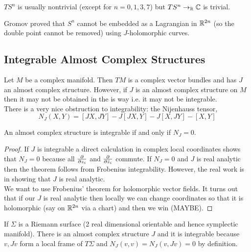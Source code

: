 \documentclass[12pt]{article}
\begin{document}
\begin{rmk}
$T S^n$ is usually nontrivial (except for $n = 0,1,3,7$) but $T S^n \to_{\mathbb{R}} \mathbb{C}$ is trivial.
\end{rmk}

\begin{rmk}
Gromov proved that $S^n$ cannot be embedded as a Lagrangian in $\mathbb{R}^{2n}$ (so the double point cannot be removed) using $J$-holomorphic curves.
\end{rmk}

\subsection{Integrable Almost Complex Structures}

Let $M$ be a complex manifold. Then $T M$ is a complex vector bundles and has $J$ an almost complex structure. However, if $J$ is an almost complex structure on $M$ then it may not be obtained in the is way i.e. it may not be integrable. 
\bigskip\\
There is a very nice obstruction to integrability: the Nijenhauss tensor,
\[ N_J(X,Y) = [JX, JY] - J[JX, Y] - J[X,JY] - [X,Y] \]

\begin{theorem}
An almost complex structure is integrable if and only if $N_J = 0$.
\end{theorem}

\begin{proof}
If $J$ is integrable a direct calculation in complex local coordinates shows that $N_J = 0$ because all $\frac{\partial{}}{\partial{z_i}}$ and $\frac{\partial{}}{\partial{\bar{z}_i}}$ commute. If $N_J = 0$ and $J$ is real analytic then the theorem follows from Frobenius integrability. However, the real work is in showing that $J$ is real analytic.
\bigskip\\
We want to use Frobenius' theorem for holomorphic vector fields. It turns out that if our $J$ is real analytic then locally we can change coordinates so that it is holomorphic (say on $\mathbb{R}^{2n}$ via a chart) and then we win (MAYBE). 
\end{proof}

\begin{example}
If $\Sigma$ is a Riemann surface (2 real dimensional orientable and hence symplectic manifold). There is an almost complex structure $J$ and it is integrable because $v, J v$ form a local frame of $T \Sigma$ and $N_J(v,v) = N_J(v,Jv) = 0$ by definition. 
\end{example}
\end{document}

